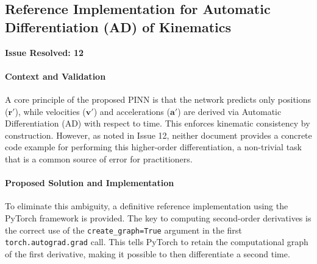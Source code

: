 \documentclass[11pt, a4paper]{article}
\begin{document}
\subsection{Reference Implementation for Automatic Differentiation (AD) of Kinematics}
\textbf{Issue Resolved: 12}
\paragraph{Context and Validation}
A core principle of the proposed PINN is that the network predicts only positions ($\mathbf{r}'$), while velocities ($\mathbf{v}'$) and accelerations ($\mathbf{a}'$) are derived via Automatic Differentiation (AD) with respect to time. This enforces kinematic consistency by construction. However, as noted in Issue 12, neither document provides a concrete code example for performing this higher-order differentiation, a non-trivial task that is a common source of error for practitioners.

\paragraph{Proposed Solution and Implementation}
To eliminate this ambiguity, a definitive reference implementation using the PyTorch framework is provided. The key to computing second-order derivatives is the correct use of the \texttt{create\_graph=True} argument in the first \texttt{torch.autograd.grad} call. This tells PyTorch to retain the computational graph of the first derivative, making it possible to then differentiate a second time.
\end{document}
